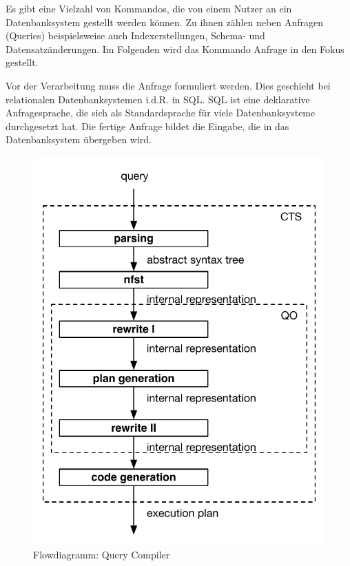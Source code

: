 Es gibt eine Vielzahl von Kommandos, die von einem Nutzer an ein Datenbanksystem gestellt werden können. Zu ihnen zählen neben Anfragen (Queries) beispielsweise auch Indexerstellungen, Schema- und Datensatzänderungen. Im Folgenden wird das Kommando Anfrage in den Fokus gestellt.

Vor der Verarbeitung muss die Anfrage formuliert werden. Dies geschieht bei relationalen Datenbanksystemen i.d.R. in \ac{SQL}. \ac{SQL} ist eine deklarative Anfragesprache, die sich als Standardsprache für viele Datenbanksysteme durchgesetzt hat. Die fertige Anfrage bildet die Eingabe, die in das Datenbanksystem übergeben wird. 


\begin{figure}[ht]
  \centering
  \includegraphics[scale=0.75]{02_Related_Work/QCArchitecture.pdf}
  \caption{Flowdiagramm: Query Compiler }
  \label{DBMS_Interpreter}
\end{figure}


